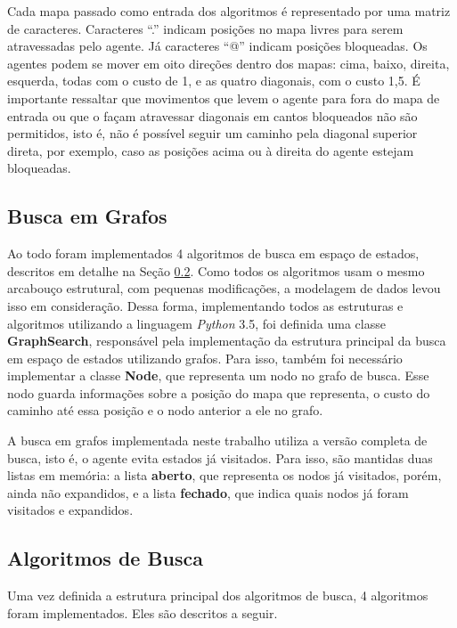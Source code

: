 \documentclass[12pt]{article}
\begin{document}
Cada mapa passado como entrada dos algoritmos é representado por uma matriz de caracteres. Caracteres ``.'' indicam posições no mapa livres para serem atravessadas pelo agente. Já caracteres ``@'' indicam posições bloqueadas. Os agentes podem se mover em oito direções dentro dos mapas: cima, baixo, direita, esquerda, todas com o custo de 1, e as quatro diagonais, com o custo 1,5. É importante ressaltar que movimentos que levem o agente para fora do mapa de entrada ou que o façam atravessar diagonais em cantos bloqueados não são permitidos, isto é, não é possível seguir um caminho pela diagonal superior direta, por exemplo, caso as posições acima ou à direita do agente estejam bloqueadas.

\subsection{Busca em Grafos}

Ao todo foram implementados 4 algoritmos de busca em espaço de estados, descritos em detalhe na Seção \ref{sec:alg}. Como todos os algoritmos usam o mesmo arcabouço estrutural, com pequenas modificações, a modelagem de dados levou isso em consideração. Dessa forma, implementando todos as estruturas e algoritmos utilizando a linguagem \textit{Python} 3.5, foi definida uma classe \textbf{GraphSearch}, responsável pela implementação da estrutura principal da busca em espaço de estados utilizando grafos. Para isso, também foi necessário implementar a classe \textbf{Node}, que representa um nodo no grafo de busca. Esse nodo guarda informações sobre a posição do mapa que representa, o custo do caminho até essa posição e o nodo anterior a ele no grafo.

A busca em grafos implementada neste trabalho utiliza a versão completa de busca, isto é, o agente evita estados já visitados. Para isso, são mantidas duas listas em memória: a lista \textbf{aberto}, que representa os nodos já visitados, porém, ainda não expandidos, e a lista \textbf{fechado}, que indica quais nodos já foram visitados e expandidos.

\subsection{Algoritmos de Busca} \label{sec:alg}

Uma vez definida a estrutura principal dos algoritmos de busca, 4 algoritmos foram implementados. Eles são descritos a seguir.
\end{document}

